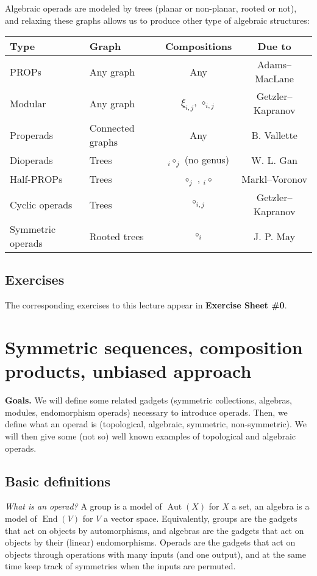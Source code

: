 \documentclass[fleqn,a4paper, twoside]{article}
\newcommand{\0}{\langle 0\rangle}
\newcommand{\End}{\operatorname{End}}
\DeclareRobustCommand{\[}{\begin{equation}}%
\DeclareRobustCommand{\]}{\end{equation}}%
\theoremstyle{mytheorem}
\theoremstyle{introthm}
\theoremstyle{mydefinition}
\theoremstyle{mydefinition2}
\theoremstyle{plain} %
\newcommand{\?}{\,?\,}
\theoremstyle{mytheorem}
\theoremstyle{plain} %
\begin{document}
Algebraic operads are modeled by trees (planar or
non-planar, rooted or not), and relaxing these
graphs allows us to produce other type of 
algebraic structures:
\begin{center}
\begin{tabular}{@{}llcc@{}} \toprule
Type & Graph & Compositions & Due to \\ \midrule
PROPs & Any graph & Any  & Adams--MacLane \\
Modular & Any graph & $\xi_{i,j}$, $\circ_{i,j}$  & Getzler--Kapranov\\ 
Properads & Connected graphs & Any & B. Vallette \\
Dioperads & Trees & ${}_i\circ_j$ (no genus) & W. L. Gan \\
Half-PROPs & Trees & $\circ_j$ , ${}_i\circ$ & 
 Markl--Voronov \\ 
Cyclic operads & Trees &  $\circ_{i,j}$ & Getzler--Kapranov\\ 
Symmetric operads & Rooted trees & $\circ_i$  & J. P. May \\ 
\bottomrule
\end{tabular}
\end{center}

\subsection{Exercises}

The corresponding exercises to this lecture appear in \textbf{Exercise Sheet \#0}.

\pagebreak

\section{Symmetric sequences, composition products, unbiased approach}

\textbf{Goals.}
We will define
some related gadgets (symmetric collections,
algebras, modules, endomorphism operads)
necessary to introduce operads. 
Then, we define what an operad is (topological,
algebraic, symmetric, non-symmetric). 
We will then give some
(not so) well known examples of topological
and algebraic operads.

\subsection{Basic definitions}
\emph{What is an operad?} A group is a model of
$\operatorname{Aut}(X)$ for $X$ a set, an algebra
is a model of $\End(V)$ for $V$
a vector space. Equivalently, groups are the
gadgets that act on objects by automorphisms,
and algebras are the gadgets that act
on objects by their (linear) endomorphisms. 
Operads are the gadgets that act on
objects through operations with many 
inputs (and one output), and at the same
time keep track of symmetries when
the inputs are permuted.
\end{document}
